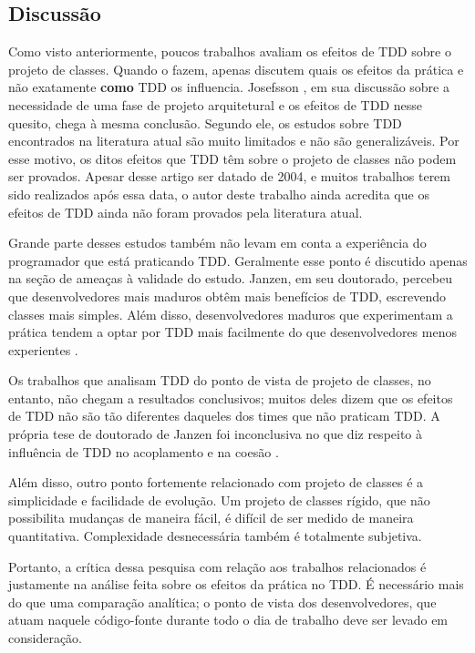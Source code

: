 \subsection{Discussão}

Como visto anteriormente, poucos trabalhos avaliam os efeitos de TDD sobre o
projeto de classes. Quando o fazem, apenas discutem quais os efeitos da prática
e não exatamente \textbf{como} TDD os influencia. Josefsson
\cite{josefsson}, em sua discussão sobre a necessidade de uma fase de projeto
arquitetural e os efeitos de TDD nesse quesito, chega à mesma conclusão. Segundo
ele, os estudos sobre TDD encontrados na literatura atual são muito limitados e
não são generalizáveis. Por esse motivo, os ditos efeitos que TDD têm 
sobre o projeto de classes não podem ser provados. Apesar desse artigo ser datado de 2004, e
muitos trabalhos terem sido realizados após essa data, o autor deste trabalho ainda acredita 
que os efeitos de TDD ainda não foram provados pela literatura atual.

Grande parte desses estudos também não levam em conta a experiência do
programador que está praticando TDD. Geralmente esse ponto é discutido apenas 
na seção de ameaças à validade do estudo. Janzen, em seu doutorado, percebeu que
desenvolvedores mais maduros obtêm mais benefícios de TDD, escrevendo classes
mais simples. Além disso, desenvolvedores maduros que experimentam a prática
tendem a optar por TDD mais facilmente do que desenvolvedores menos experientes
\cite{janzen-phd}.

Os trabalhos que analisam TDD do ponto de vista de projeto de classes, no entanto, não
chegam a resultados conclusivos; muitos deles dizem que os efeitos
de TDD não são tão diferentes daqueles dos times que não praticam TDD.  A própria tese de
doutorado de Janzen foi inconclusiva no que diz respeito à influência de TDD no 
acoplamento e na coesão \cite{janzen-phd}. 

Além disso, outro ponto fortemente relacionado com projeto de classes é a simplicidade e
facilidade de evolução. Um projeto de classes rígido, que não possibilita mudanças de maneira
fácil, é difícil de ser medido de maneira quantitativa. Complexidade
desnecessária também é totalmente subjetiva. 

Portanto, a crítica dessa pesquisa
com relação aos trabalhos relacionados é justamente na análise feita sobre os
efeitos da prática no TDD. É necessário mais do que uma comparação analítica; o
ponto de vista dos desenvolvedores, que atuam naquele código-fonte durante todo
o dia de trabalho deve ser levado em consideração.

